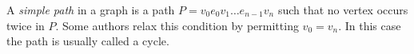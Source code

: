 \documentclass[12pt]{article}
\begin{document}
A \emph{simple path} in a graph is a path $P=v_0 e_0 v_1\dots e_{n-1} v_n$
such that no vertex occurs twice in $P$. 
Some authors relax this condition by permitting $v_0=v_n$.  In this case the path is usually called a cycle.
\end{document}
